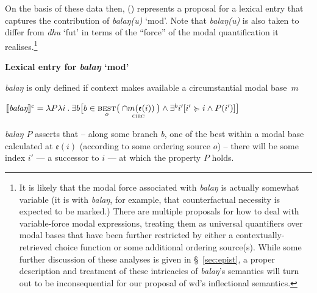 On the basis of these data then, () represents a proposal for a lexical entry that captures the contribution of \textit{balaŋ(u)} `\gls{mod}'. Note that \textit{balaŋ(u)} is also taken to differ from \textit{dhu} `\gls{fut}' in terms of the ``force'' of the modal quantification it realises.\footnote{It is likely that the modal force associated with \textit{balaŋ} is actually somewhat variable (it is with \textit{balaŋ}, for example, that counterfactual necessity is expected to be marked.) There are multiple proposals for how to deal with variable-force modal expressions, treating them as universal quantifiers over modal bases that have been further restricted by either a contextually-retrieved choice function or some additional ordering source(s). While some further discussion of these analyses is given in \S~\ref{sec:epist}, a proper description and treatment of these intricacies of \textit{balaŋ}'s semantics will turn out to be inconsequential for our proposal of \gls{wd}'s inflectional semantics.} 



\pex \textbf{Lexical entry for \textit{balaŋ} `\gls{mod}'}

\textit{balaŋ} is only defined if context makes available a circumstantial modal base~$ m $

$ \denote[c]{\textit{balaŋ}}=\lambda P\lambda i\mathbin.\exists b\big[b\in\underset{o}{\textsc{best}}\big(\underset{\textsc{circ}}{\cap m(\mathfrak e( i))}\big)\wedge\exists^b i'[i'\succcurlyeq i\wedge P(i')]\big] $

\textit{balaŋ $ P $} %
asserts that -- along some branch \textit{b}, one of the best within a modal base calculated at $\mathfrak{e}(i) $ (according to some ordering source $ o $) -- there will be some  index $ i' $ --- a successor to $ i $ --- at which the property $ P $ holds.

\xe

